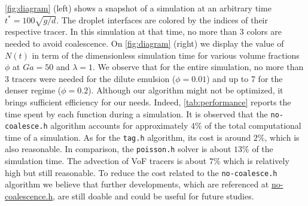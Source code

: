 \ref{fig:diagram} (left) shows a snapshot of a simulation at an arbitrary time $t^* = 100 \sqrt{g/d}$. 
The droplet interfaces are colored by the indices of their respective tracer. 
In this simulation at that time, no more than 3 colors are needed to avoid coalescence.
On \ref{fig:diagram} (right) we display the value of $N(t)$ in term of the dimensionless simulation time for various volume fractions $\phi$ at $Ga = 50$ and  $\lambda = 1$. 
We observe that for the entire simulation, no more than 3 tracers were needed for the dilute emulsion ($\phi = 0.01$) and up to 7 for the denser regime ($\phi = 0.2$). 
Although our algorithm might not be optimized, it brings sufficient efficiency for our needs. 
Indeed, \ref{tab:performance} reports the time spent by each function during a simulation. 
It is observed that the \texttt{no-coalesce.h} algorithm accounts for approximately $4\%$ of the total computational time of a simulation. 
As for the \texttt{tag.h} algorithm, its cost is around $2\%$, which is also reasonable.
In comparison, the \texttt{poisson.h} solver is about $13\%$ of the simulation time. 
The advection of VoF tracers is about $7\%$ which is relatively high but still reasonable.
To reduce the cost related to the \texttt{no-coalesce.h} algorithm we believe that further developments, which are referenced at \href{http://basilisk.fr/sandbox/fintzin/Rising-Suspenion/no-coalescence.h}{no-coalescence.h}, are still doable and could be useful for future studies.
